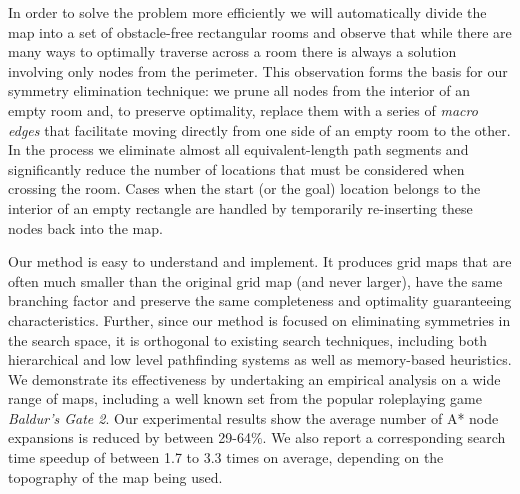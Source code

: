 In order to solve the problem more efficiently we will automatically divide the map into a set of obstacle-free rectangular rooms and 
observe that while there are many ways to optimally traverse across a room there is always a solution 
involving only nodes from the perimeter.
This observation forms the basis for our symmetry elimination technique: we prune all nodes from the interior
of an empty room and, to preserve optimality, replace them with a series of \emph{macro edges} that facilitate 
moving directly from one side of an empty room to the other. 
In the process we eliminate almost all equivalent-length path segments and significantly reduce the number of 
locations that must be considered when crossing the room.
Cases when the start (or the goal) location belongs to the interior of an empty rectangle are handled by
temporarily re-inserting these nodes back into the map.
\par
Our method is easy to understand and implement.
It produces grid maps that are often much smaller than the original grid map
(and never larger), have the same branching factor and preserve the same completeness and optimality 
guaranteeing characteristics.
Further, since our method is focused on eliminating symmetries in the search space, it is orthogonal to existing 
search techniques, including both hierarchical and low level pathfinding systems as well as memory-based heuristics.
We demonstrate its effectiveness by undertaking an empirical analysis on a wide range of maps, 
including a well known set from the popular roleplaying game \emph{Baldur's Gate 2}. 
Our experimental results show the average number of A* node expansions is reduced by between 29-64\%. 
We also report a corresponding search time speedup of between 1.7 to 3.3 times on average, depending on the 
topography of the map being used.



